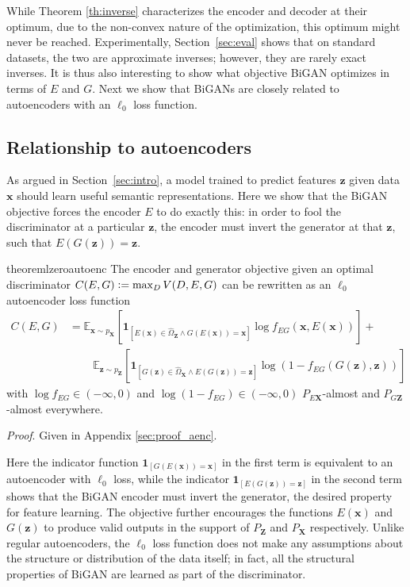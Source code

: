\documentclass{article}
\newcommand{\proof}{\textit{Proof}.\xspace}
\newcommand{\expect}[2]{\mathbb{E}_{#1}\left[#2\right]}
\newcommand{\ldeltafunc}[1]{\mathbf{1}_{\left[#1\right]}}
\newcommand{\logp}[1]{\log\left(#1\right)}
\newcommand{\defeq}{\vcentcolon=}
\renewcommand{\vec}[1]{\mathbf{#1}}
\newcommand{\x}{\vec{x}}
\newcommand{\X}{\vec{X}}
\newcommand{\hOX}{\hat{\Omega}_\X}
\newcommand{\z}{\vec{z}}
\newcommand{\Z}{\vec{Z}}
\newcommand{\hOZ}{\hat{\Omega}_\Z}
\newcommand{\refsec}[1]{Section~\ref{sec:#1}}
\begin{document}
While Theorem \ref{th:inverse} characterizes the encoder and decoder at their optimum,
due to the non-convex nature of the optimization, this optimum might never be reached.
Experimentally, \refsec{eval} shows that on standard datasets,
the two are approximate inverses; however, they are rarely exact inverses.
It is thus also interesting to show what objective BiGAN optimizes in terms of $E$ and $G$.
Next we show that BiGANs are closely related to autoencoders with an $\ell_0$ loss function.

\subsection{Relationship to autoencoders}

As argued in Section~\ref{sec:intro}, a model trained to predict features $\z$ given data $\x$ should learn useful semantic representations.
Here we show that the BiGAN objective forces the encoder $E$ to do exactly this:
in order to fool the discriminator at a particular $\z$,
the encoder must invert the generator at that $\z$, such that $E(G(\z)) = \z$.

\begin{restatable}{theorem}{lzeroautoenc}
  \label{thm:kld}
  The encoder and generator objective given an optimal discriminator
  $C(E,G) \defeq \max_D V(D, E, G)$
  can be rewritten as an $\ell_0$ autoencoder loss function
  \begin{align*}
  C(E, G)
  &=
  \expect{\x \sim p_\X}{\ldeltafunc{E(\x) \in \hOZ \land G(E(\x))=\x} \log f_{EG}(\x, E(\x))} + \\
  &\phantom{=} \; \; \;
  \expect{\z \sim p_\Z}{\ldeltafunc{G(\z) \in \hOX \land E(G(\z))=\z} \logp{1 - f_{EG}(G(\z), \z)}}
  \end{align*}
  with $\log f_{EG} \in (-\infty, 0)$ and $\logp{ 1 - f_{EG} } \in (-\infty, 0)$ $P_{E\X}$-almost and $P_{G\Z}$-almost everywhere.
\end{restatable}
\proof Given in Appendix \ref{sec:proof_aenc}.

Here the indicator function $\ldeltafunc{G(E(\x))=\x}$ in the first term is equivalent to an autoencoder with $\ell_0$ loss,
while the indicator $\ldeltafunc{E(G(\z))=\z}$ in the second term shows that the BiGAN encoder must invert the generator,
the desired property for feature learning.
The objective further encourages the functions $E(\x)$ and $G(\z)$ to produce valid outputs in the support of $P_\Z$ and $P_\X$ respectively.
Unlike regular autoencoders, the $\ell_0$ loss function does not make any assumptions about the structure or distribution of the data itself;
in fact, all the structural properties of BiGAN are learned as part of the discriminator.
\end{document}
